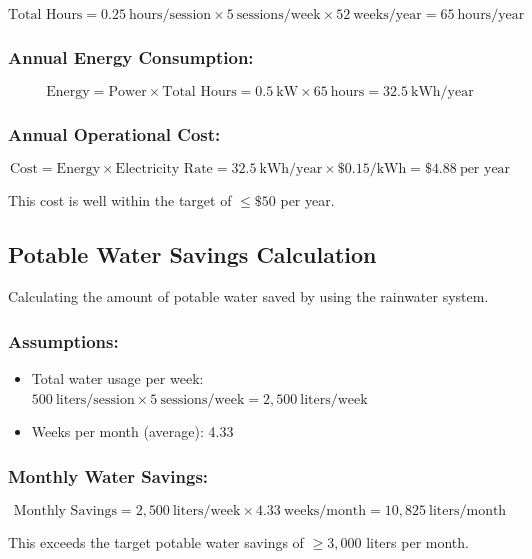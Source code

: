 \documentclass[12pt]{report}
\begin{document}
\[
\text{Total Hours} = 0.25\ \text{hours/session} \times 5\ \text{sessions/week} \times 52\ \text{weeks/year} = 65\ \text{hours/year}
\]

\subsubsection{Annual Energy Consumption:}

\[
\text{Energy} = \text{Power} \times \text{Total Hours} = 0.5\ \text{kW} \times 65\ \text{hours} = 32.5\ \text{kWh/year}
\]

\subsubsection{Annual Operational Cost:}

\[
\text{Cost} = \text{Energy} \times \text{Electricity Rate} = 32.5\ \text{kWh/year} \times \$0.15/\text{kWh} = \$4.88\ \text{per year}
\]

\noindent This cost is well within the target of \(\leq\$50\) per year.

\subsection{Potable Water Savings Calculation}

Calculating the amount of potable water saved by using the rainwater system.

\subsubsection{Assumptions:}

\begin{itemize}
\item Total water usage per week: \( 500\ \text{liters/session} \times 5\ \text{sessions/week} = 2,500\ \text{liters/week} \)
\item Weeks per month (average): 4.33
\end{itemize}

\subsubsection{Monthly Water Savings:}

\[
\text{Monthly Savings} = 2,500\ \text{liters/week} \times 4.33\ \text{weeks/month} = 10,825\ \text{liters/month}
\]

This exceeds the target potable water savings of \(\geq3,000\) liters per month.
\end{document}
